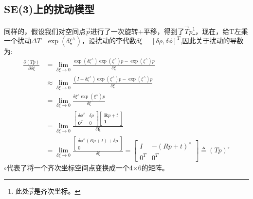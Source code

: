\subsection{SE(3)上的扰动模型}
同样的，假设我们对空间点$\vec p$进行了一次旋转+平移，得到了$\vec T p$\footnote{此处$\vec p$是齐次坐标。}，现在，给T左乘一个扰动$\Delta T$=$\exp{(\delta \xi^\wedge)}$，设扰动的李代数$\delta \xi=[\delta \rho,\delta \phi]^T$,因此关于扰动的导数为:
\begin{equation}
\begin{aligned}
\frac{\partial(T p)}{\partial \delta \xi}
&=\lim _{\delta \xi \rightarrow 0} \frac{\exp \left(\delta \xi^{\wedge}\right) \exp \left(\xi^{\wedge}\right) p-\exp \left(\xi^{\wedge}\right) p}{\delta \xi} \\
& \approx \lim _{\delta \xi \rightarrow 0} \frac{\left(I+\delta \xi^{\wedge}\right) \exp \left(\xi^{\wedge}\right) p-\exp \left(\xi^{\wedge}\right) p}{\delta \xi} \\
&=\lim _{\delta \xi \rightarrow 0} \frac{\delta \xi^{\wedge} \exp \left(\xi^{\wedge}\right) p}{\delta \xi}\\
&=\lim _{\delta \xi \rightarrow 0} \frac{\left[ \begin{array}{cc}{\delta \phi^{\wedge}} & {\delta \rho} \\ {\mathbf{0}^{T}} & {0}\end{array}\right] \left[ \begin{array}{c}{\boldsymbol{R} p+t} \\ {\mathbf{1}}\end{array}\right]}{\delta \boldsymbol{\xi}}\\
&=\lim _{\delta \xi \rightarrow 0} \frac{\left[ \begin{array}{c}{\delta \phi^{\wedge}(R p+t)+\delta \rho} \\ {0}\end{array}\right]}{\delta \xi}=\left[ \begin{array}{cc}{I} & {-(R p+t)^{\wedge}} \\ {0^{T}} & {0^{T}}\end{array}\right] \triangleq(T p)^{\circ}
\end{aligned}
\end{equation}
$\circ$代表了将一个齐次坐标空间点变换成一个4$\times$6的矩阵。























